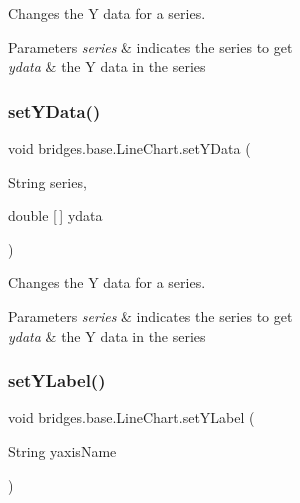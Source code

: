 Changes the Y data for a series. 


\begin{DoxyParams}{Parameters}
{\em series} & indicates the series to get \\
\hline
{\em ydata} & the Y data in the series \\
\hline
\end{DoxyParams}
\mbox{\label{classbridges_1_1base_1_1_line_chart_aa8094fad197ae35d93f9feab5de91f59}} 
\subsubsection{\texorpdfstring{set\+Y\+Data()}{setYData()}\hspace{0.1cm}{\footnotesize\ttfamily [2/2]}}
{\footnotesize\ttfamily void bridges.\+base.\+Line\+Chart.\+set\+Y\+Data (\begin{DoxyParamCaption}\item[{String}]{series,  }\item[{double \mbox{[}$\,$\mbox{]}}]{ydata }\end{DoxyParamCaption})}



Changes the Y data for a series. 


\begin{DoxyParams}{Parameters}
{\em series} & indicates the series to get \\
\hline
{\em ydata} & the Y data in the series \\
\hline
\end{DoxyParams}
\mbox{\label{classbridges_1_1base_1_1_line_chart_adddccbe77ebd2590f426fab9c8227457}} 
\subsubsection{\texorpdfstring{set\+Y\+Label()}{setYLabel()}}
{\footnotesize\ttfamily void bridges.\+base.\+Line\+Chart.\+set\+Y\+Label (\begin{DoxyParamCaption}\item[{String}]{yaxis\+Name }\end{DoxyParamCaption})}



